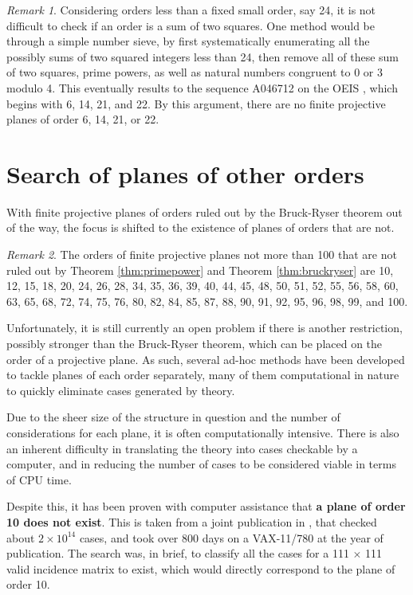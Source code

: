 \documentclass{report}
\theoremstyle{definition}\newtheorem*{definition}{Definition}
\theoremstyle{definition}\newtheorem*{example}{Example}
\theoremstyle{remark}\newtheorem*{remark}{Remark}
\begin{document}
\begin{remark}
Considering orders less than a fixed small order, say 24, it is not difficult to check if an order is a sum of two squares. One method would be through a simple number sieve, by first systematically enumerating all the possibly sums of two squared integers less than 24, then remove all of these sum of two squares, prime powers, as well as natural numbers congruent to 0 or 3 modulo 4. This eventually results to the sequence A046712 on the OEIS \cite{A046712}, which begins with 6, 14, 21, and 22. By this argument, there are no finite projective planes of order 6, 14, 21, or 22.
\end{remark}

\pagebreak

\section{Search of planes of other orders}

With finite projective planes of orders ruled out by the Bruck-Ryser theorem out of the way, the focus is shifted to the existence of planes of orders that are not.

\begin{remark}
The orders of finite projective planes not more than 100 that are not ruled out by Theorem \ref{thm:primepower} and Theorem \ref{thm:bruckryser} are 10, 12, 15, 18, 20, 24, 26, 28, 34, 35, 36, 39, 40, 44, 45, 48, 50, 51, 52, 55, 56, 58, 60, 63, 65, 68, 72, 74, 75, 76, 80, 82, 84, 85, 87, 88, 90, 91, 92, 95, 96, 98, 99, and 100.
\end{remark}

Unfortunately, it is still currently an open problem if there is another restriction, possibly stronger than the Bruck-Ryser theorem, which can be placed on the order of a projective plane. As such, several ad-hoc methods have been developed to tackle planes of each order separately, many of them computational in nature to quickly eliminate cases generated by theory.

Due to the sheer size of the structure in question and the number of considerations for each plane, it is often computationally intensive. There is also an inherent difficulty in translating the theory into cases checkable by a computer, and in reducing the number of cases to be considered viable in terms of CPU time.

Despite this, it has been proven with computer assistance that \textbf{a plane of order 10 does not exist}. This is taken from a joint publication in \cite{order10}, that checked about $ 2 \times 10^{14} $ cases, and took over 800 days on a VAX-11/780 at the year of publication. The search was, in brief, to classify all the cases for a 111 $ \times $ 111 valid incidence matrix to exist, which would directly correspond to the plane of order 10.
\end{document}
